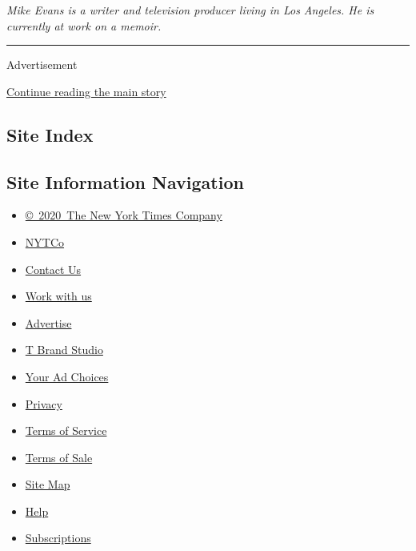 \emph{Mike Evans is a writer and television producer living in Los
Angeles. He is currently at work on a memoir.}

\begin{center}\rule{0.5\linewidth}{\linethickness}\end{center}

Advertisement

\protect\hyperlink{after-bottom}{Continue reading the main story}

\hypertarget{site-index}{%
\subsection{Site Index}\label{site-index}}

\hypertarget{site-information-navigation}{%
\subsection{Site Information
Navigation}\label{site-information-navigation}}

\begin{itemize}
\tightlist
\item
  \href{https://help.nytimes.com/hc/en-us/articles/115014792127-Copyright-notice}{©~2020~The
  New York Times Company}
\end{itemize}

\begin{itemize}
\tightlist
\item
  \href{https://www.nytco.com/}{NYTCo}
\item
  \href{https://help.nytimes.com/hc/en-us/articles/115015385887-Contact-Us}{Contact
  Us}
\item
  \href{https://www.nytco.com/careers/}{Work with us}
\item
  \href{https://nytmediakit.com/}{Advertise}
\item
  \href{http://www.tbrandstudio.com/}{T Brand Studio}
\item
  \href{https://www.nytimes.com/privacy/cookie-policy\#how-do-i-manage-trackers}{Your
  Ad Choices}
\item
  \href{https://www.nytimes.com/privacy}{Privacy}
\item
  \href{https://help.nytimes.com/hc/en-us/articles/115014893428-Terms-of-service}{Terms
  of Service}
\item
  \href{https://help.nytimes.com/hc/en-us/articles/115014893968-Terms-of-sale}{Terms
  of Sale}
\item
  \href{https://spiderbites.nytimes.com}{Site Map}
\item
  \href{https://help.nytimes.com/hc/en-us}{Help}
\item
  \href{https://www.nytimes.com/subscription?campaignId=37WXW}{Subscriptions}
\end{itemize}
